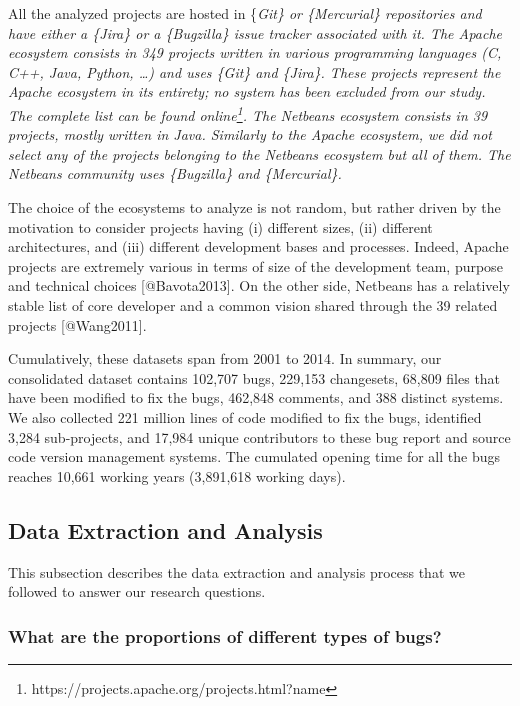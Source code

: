 All the analyzed projects are hosted in \{\it Git\} or \{\it Mercurial\}
repositories and have either a \{\it Jira\} or a \{\it Bugzilla\} issue
tracker associated with it. The Apache ecosystem consists in 349
projects written in various programming languages (C, C++, Java, Python,
\ldots{}) and uses \{\it Git\} and \{\it Jira\}. These projects
represent the Apache ecosystem in its entirety; no system has been
excluded from our study. The complete list can be found
online\footnote{https://projects.apache.org/projects.html?name}. The
Netbeans ecosystem consists in 39 projects, mostly written in Java.
Similarly to the Apache ecosystem, we did not select any of the projects
belonging to the Netbeans ecosystem but all of them. The Netbeans
community uses \{\it Bugzilla\} and \{\it Mercurial\}.

The choice of the ecosystems to analyze is not random, but rather driven
by the motivation to consider projects having (i) different sizes, (ii)
different architectures, and (iii) different development bases and
processes. Indeed, Apache projects are extremely various in terms of
size of the development team, purpose and technical choices
{[}@Bavota2013{]}. On the other side, Netbeans has a relatively stable
list of core developer and a common vision shared through the 39 related
projects {[}@Wang2011{]}.

Cumulatively, these datasets span from 2001 to 2014. In summary, our
consolidated dataset contains 102,707 bugs, 229,153 changesets, 68,809
files that have been modified to fix the bugs, 462,848 comments, and 388
distinct systems. We also collected 221 million lines of code modified
to fix the bugs, identified 3,284 sub-projects, and 17,984 unique
contributors to these bug report and source code version management
systems. The cumulated opening time for all the bugs reaches 10,661
working years (3,891,618 working days).

\subsection{Data Extraction and
Analysis}\label{data-extraction-and-analysis}

This subsection describes the data extraction and analysis process that
we followed to answer our research questions.

\subsubsection{What are the proportions of different types of
bugs?}\label{what-are-the-proportions-of-different-types-of-bugs}

